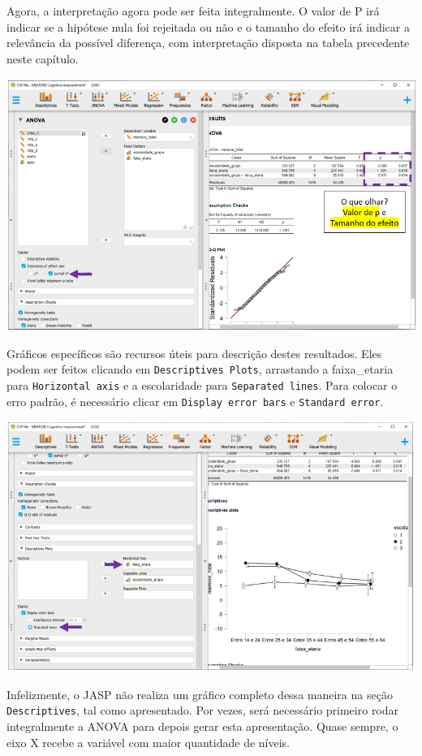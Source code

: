\documentclass[
]{book}
\begin{document}
Agora, a interpretação agora pode ser feita integralmente. O valor de P
irá indicar se a hipótese nula foi rejeitada ou não e o tamanho do
efeito irá indicar a relevância da possível diferença, com interpretação
disposta na tabela precedente neste capítulo.

\includegraphics{./img/cap_anova_fatorial_resultados3.png}

Gráficos específicos são recursos úteis para descrição destes
resultados. Eles podem ser feitos clicando em
\texttt{Descriptives\ Plots}, arrastando a faixa\_etaria para
\texttt{Horizontal\ axis} e a escolaridade para
\texttt{Separated\ lines}. Para colocar o erro padrão, é necessário
clicar em \texttt{Display\ error\ bars} e \texttt{Standard\ error}.

\includegraphics{./img/cap_anova_fatorial_descriptives_final.png}

Infelizmente, o JASP não realiza um gráfico completo dessa maneira na
seção \texttt{Descriptives}, tal como apresentado. Por vezes, será
necessário primeiro rodar integralmente a ANOVA para depois gerar esta
apresentação. Quase sempre, o eixo X recebe a variável com maior
quantidade de níveis.
\end{document}
